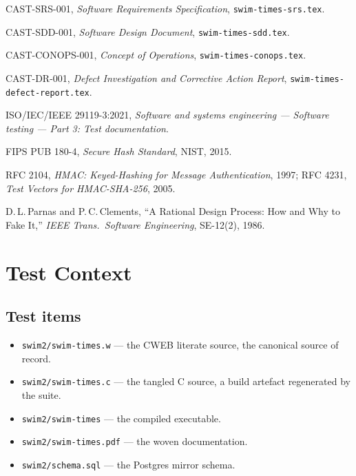 \documentclass[12pt]{article}
\newcommand{\code}[1]{\texttt{#1}}
\begin{document}
\begin{enumerate}[leftmargin=*,label={[\arabic*]}]
\item CAST-SRS-001, \textit{Software Requirements Specification},
      \code{swim-times-srs.tex}.
\item CAST-SDD-001, \textit{Software Design Document},
      \code{swim-times-sdd.tex}.
\item CAST-CONOPS-001, \textit{Concept of Operations},
      \code{swim-times-conops.tex}.
\item CAST-DR-001, \textit{Defect Investigation and Corrective Action
      Report}, \code{swim-times-defect-report.tex}.
\item ISO/IEC/IEEE 29119-3:2021, \textit{Software and systems
      engineering --- Software testing --- Part 3: Test documentation}.
\item FIPS PUB 180-4, \textit{Secure Hash Standard}, NIST, 2015.
\item RFC 2104, \textit{HMAC: Keyed-Hashing for Message
      Authentication}, 1997; RFC 4231, \textit{Test Vectors for
      HMAC-SHA-256}, 2005.
\item D.\,L.\,Parnas and P.\,C.\,Clements, ``A Rational Design Process:
      How and Why to Fake It,'' \textit{IEEE Trans.\ Software
      Engineering}, SE-12(2), 1986.
\end{enumerate}

\section{Test Context}

\subsection{Test items}

\begin{itemize}
  \item \code{swim2/swim-times.w} --- the CWEB literate source, the
        canonical source of record.
  \item \code{swim2/swim-times.c} --- the tangled C source, a build
        artefact regenerated by the suite.
  \item \code{swim2/swim-times} --- the compiled executable.
  \item \code{swim2/swim-times.pdf} --- the woven documentation.
  \item \code{swim2/schema.sql} --- the Postgres mirror schema.
\end{itemize}
\end{document}
